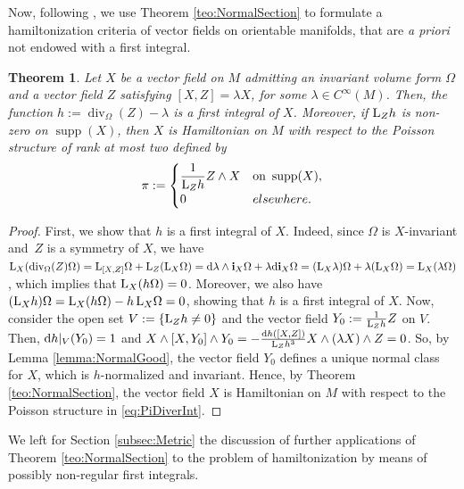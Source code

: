 \documentclass[pdftex]{sigma}%
\newcommand{\dd}{{\rm d}}
\newcommand{\ii}{\mathbf{i}}
\numberwithin{equation}{section}
\newtheorem{Theorem}{Theorem}[section]
\begin{document}
Now, following \cite{LPS-12}, we use Theorem \ref{teo:NormalSection} to formulate a hamiltonization criteria of vector fields on orientable manifolds, that are \emph{a priori} not endowed with a first integral.

\begin{Theorem}\label{teo:DiverInt}
Let $X$ be a vector field on $M$ admitting an invariant volume form $\Omega$ and a vector field $Z$ satisfying $[X,Z]=\lambda X$, for some $\lambda \in C^{\infty}(M)$. Then, the function $h:=\operatorname{div}_{\Omega}(Z)-\lambda$ is a first integral of $X$. Moreover, if ${\rm L}_{Z}h$ is non-zero on $\operatorname{supp}(X)$, then $X$ is Hamiltonian on $M$ with respect to the Poisson structure of rank at most two defined by
 \begin{equation}\label{eq:PiDiverInt}
 \pi :=
 \begin{cases}
 \dfrac{1}{{\rm L}_{Z}h} Z \wedge X & \text{on} \  \operatorname{supp}(X),
 \\
 0 & elsewhere.
 \end{cases}
 \end{equation}
\end{Theorem}
\begin{proof}
First, we show that $h$ is a first integral of $X$. Indeed, since $\Omega$ is $X$-invariant and~$Z$ is a symmetry of $X$, we have ${\rm L}_{X}({\rm div}_{\Omega}(Z)\Omega) = {\rm L}_{[X,Z]}\Omega + {\rm L}_{Z}({\rm L}_{X}\Omega) = \dd \lambda\wedge\ii_{X}\Omega + \lambda\dd \ii_{X}\Omega = ({\rm L}_{X}\lambda)\Omega + \lambda({\rm L}_{X}\Omega) = {\rm L}_{X}(\lambda\Omega)$, which implies that ${\rm L}_{X}(h\Omega)=0$. Moreover, we also have $({\rm L}_{X}h)\Omega = {\rm L}_{X}(h\Omega) - h\,{\rm L}_{X}\Omega = 0$, showing that $h$ is a first integral of $X$.
Now, consider the open set $V := \{{\rm L}_{Z}h\neq 0\}$ and the vector field $Y_0:=\frac{1}{{\rm L}_{Z}h}Z$ on $V$. Then, $\dd h|_{V}(Y_0)=1$ and $X \wedge [X,Y_0] \wedge Y_0 = -\tfrac{\dd h([X,Z])}{{\rm L}_{Z}h^3}X \wedge(\lambda X)\wedge Z = 0$. So, by Lemma \ref{lemma:NormalGood}, the vector field $Y_0$ defines a unique normal class for $X$, which is $h$-normalized and invariant. Hence, by Theorem \ref{teo:NormalSection}, the vector field $X$ is Hamiltonian on $M$ with respect to the Poisson structure in \eqref{eq:PiDiverInt}.
\end{proof}

We left for Section \ref{subsec:Metric} the discussion of further applications of Theorem \ref{teo:NormalSection} to the problem of hamiltonization by means of possibly non-regular first integrals.
\end{document}

